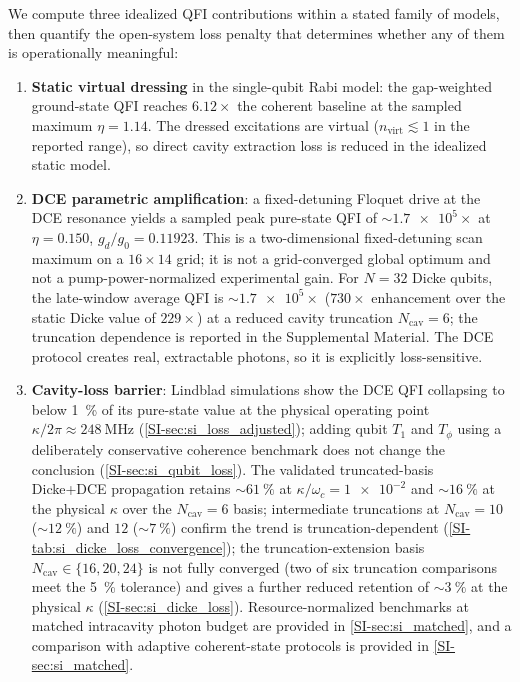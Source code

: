 \documentclass[aps,prxquantum,preprint,superscriptaddress,amsmath,amssymb]{revtex4-2}
\begin{document}
We compute three idealized QFI contributions within a stated family of models, then quantify the open-system loss penalty that determines whether any of them is operationally meaningful:
\begin{enumerate}
    \item \textbf{Static virtual dressing} in the single-qubit Rabi model: the gap-weighted ground-state QFI reaches $\num{6.12}\times$ the coherent baseline at the sampled maximum $\eta=\num{1.14}$. The dressed excitations are virtual ($n_{\text{virt}}\lesssim\num{1}$ in the reported range), so direct cavity extraction loss is reduced in the idealized static model.
    \item \textbf{DCE parametric amplification}: a fixed-detuning Floquet drive at the DCE resonance yields a sampled peak pure-state QFI of $\sim\num{1.7e5}\times$ at $\eta=\num{0.150}$, $g_d/g_0=\num{0.11923}$. This is a two-dimensional fixed-detuning scan maximum on a $16\times14$ grid; it is not a grid-converged global optimum and not a pump-power-normalized experimental gain. For $N=\num{32}$ Dicke qubits, the late-window average QFI is $\sim\num{1.7e5}\times$ ($\num{730}\times$ enhancement over the static Dicke value of $\num{229}\times$) at a reduced cavity truncation $N_{\text{cav}}=\num{6}$; the truncation dependence is reported in the Supplemental Material. The DCE protocol creates real, extractable photons, so it is explicitly loss-sensitive.
    \item \textbf{Cavity-loss barrier}: Lindblad simulations show the DCE QFI collapsing to below \qty{1}{\percent} of its pure-state value at the physical operating point $\kappa/2\pi \approx \qty{248}{\mega\hertz}$ (\cref{SI-sec:si_loss_adjusted}); adding qubit $T_1$ and $T_\phi$ using a deliberately conservative coherence benchmark does not change the conclusion (\cref{SI-sec:si_qubit_loss}). The validated truncated-basis Dicke+DCE propagation retains $\sim\!\qty{61}{\percent}$ at $\kappa/\omega_c=\num{1e-2}$ and $\sim\!\qty{16}{\percent}$ at the physical $\kappa$ over the $N_{\text{cav}}=\num{6}$ basis; intermediate truncations at $N_{\text{cav}}=\num{10}$ ($\sim\!\qty{12}{\percent}$) and $\num{12}$ ($\sim\!\qty{7}{\percent}$) confirm the trend is truncation-dependent (\cref{SI-tab:si_dicke_loss_convergence}); the truncation-extension basis $N_{\text{cav}}\in\{\num{16},\num{20},\num{24}\}$ is not fully converged (two of six truncation comparisons meet the \qty{5}{\percent} tolerance) and gives a further reduced retention of $\sim\!\qty{3}{\percent}$ at the physical $\kappa$ (\cref{SI-sec:si_dicke_loss}). Resource-normalized benchmarks at matched intracavity photon budget are provided in \cref{SI-sec:si_matched}, and a comparison with adaptive coherent-state protocols is provided in \cref{SI-sec:si_matched}.
\end{enumerate}
\end{document}
